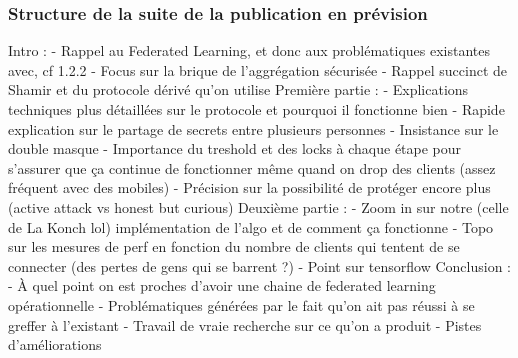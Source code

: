 \documentclass{article}
\begin{document}
\subsubsection{Structure de la suite de la publication en prévision}
    Intro : 
        - Rappel au Federated Learning, et donc aux problématiques existantes avec, cf 1.2.2
        - Focus sur la brique de l'aggrégation sécurisée
        - Rappel succinct de Shamir et du protocole dérivé qu'on utilise
    Première partie : 
        - Explications techniques plus détaillées sur le protocole et pourquoi il fonctionne bien 
            - Rapide explication sur le partage de secrets entre plusieurs personnes
            - Insistance sur le double masque
            - Importance du treshold et des locks à chaque étape pour s'assurer que ça continue de fonctionner même quand on drop des clients (assez fréquent avec des mobiles) 
            - Précision sur la possibilité de protéger encore plus (active attack vs honest but curious)
    Deuxième partie : 
        - Zoom in sur notre (celle de La Konch lol) implémentation de l'algo et de comment ça fonctionne
        - Topo sur les mesures de perf en fonction du nombre de clients qui tentent de se connecter (des pertes de gens qui se barrent ?) 
        - Point sur tensorflow 
    Conclusion : 
        - À quel point on est proches d'avoir une chaine de federated learning opérationnelle
        - Problématiques générées par le fait qu'on ait pas réussi à se greffer à l'existant
        - Travail de vraie recherche sur ce qu'on a produit
        - Pistes d'améliorations 

\printbibliography
\end{document}
